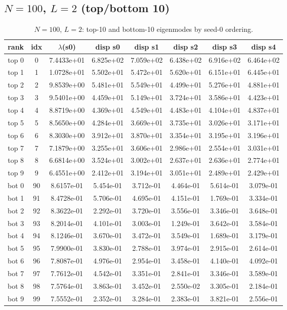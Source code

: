 \subsection{$N=100$, $L=2$ (top/bottom 10)}
\begin{table}[H]
\centering
\caption{$N=100$, $L=2$: top-10 and bottom-10 eigenmodes by seed-0 ordering.}
\label{tab:permode-N100-L2}
\begin{tabular}{c c c c c c c c}
\toprule
rank & idx & $\lambda$(s0) & disp s0 & disp s1 & disp s2 & disp s3 & disp s4 \\
\midrule
top 0 & 0 & 7.4433e+01 & 6.825e+02 & 7.059e+02 & 6.438e+02 & 6.916e+02 & 6.464e+02 \\
top 1 & 1 & 1.0728e+01 & 5.502e+01 & 5.472e+01 & 5.620e+01 & 6.151e+01 & 6.445e+01 \\
top 2 & 2 & 9.8539e+00 & 5.481e+01 & 5.549e+01 & 4.499e+01 & 5.276e+01 & 4.881e+01 \\
top 3 & 3 & 9.5401e+00 & 4.459e+01 & 5.149e+01 & 3.724e+01 & 3.586e+01 & 4.423e+01 \\
top 4 & 4 & 8.8719e+00 & 4.369e+01 & 4.549e+01 & 4.483e+01 & 4.104e+01 & 4.837e+01 \\
top 5 & 5 & 8.5650e+00 & 4.284e+01 & 3.669e+01 & 3.735e+01 & 3.026e+01 & 3.171e+01 \\
top 6 & 6 & 8.3030e+00 & 3.912e+01 & 3.870e+01 & 3.354e+01 & 3.195e+01 & 3.196e+01 \\
top 7 & 7 & 7.1879e+00 & 3.255e+01 & 3.606e+01 & 2.986e+01 & 2.554e+01 & 3.031e+01 \\
top 8 & 8 & 6.6814e+00 & 3.524e+01 & 3.002e+01 & 2.637e+01 & 2.636e+01 & 2.774e+01 \\
top 9 & 9 & 6.4551e+00 & 2.412e+01 & 3.194e+01 & 3.051e+01 & 2.489e+01 & 2.429e+01 \\
\midrule
bot 0 & 90 & 8.6157e-01 & 5.454e-01 & 3.712e-01 & 4.464e-01 & 5.614e-01 & 3.079e-01 \\
bot 1 & 91 & 8.4728e-01 & 5.706e-01 & 4.695e-01 & 4.151e-01 & 1.769e-01 & 3.334e-01 \\
bot 2 & 92 & 8.3622e-01 & 2.292e-01 & 3.720e-01 & 3.556e-01 & 3.346e-01 & 3.648e-01 \\
bot 3 & 93 & 8.2014e-01 & 4.101e-01 & 3.003e-01 & 1.249e-01 & 3.642e-01 & 3.584e-01 \\
bot 4 & 94 & 8.1246e-01 & 3.670e-01 & 3.472e-01 & 3.549e-01 & 1.689e-01 & 3.179e-01 \\
bot 5 & 95 & 7.9900e-01 & 3.830e-01 & 2.788e-01 & 3.974e-01 & 2.915e-01 & 2.614e-01 \\
bot 6 & 96 & 7.8087e-01 & 4.976e-01 & 2.954e-01 & 3.458e-01 & 4.140e-01 & 4.092e-01 \\
bot 7 & 97 & 7.7612e-01 & 4.542e-01 & 3.351e-01 & 2.841e-01 & 3.346e-01 & 3.589e-01 \\
bot 8 & 98 & 7.5764e-01 & 3.863e-01 & 3.452e-01 & 2.550e-02 & 3.305e-01 & 2.184e-01 \\
bot 9 & 99 & 7.5552e-01 & 2.352e-01 & 3.284e-01 & 2.383e-01 & 3.821e-01 & 2.556e-01 \\
\bottomrule
\end{tabular}
\end{table}

